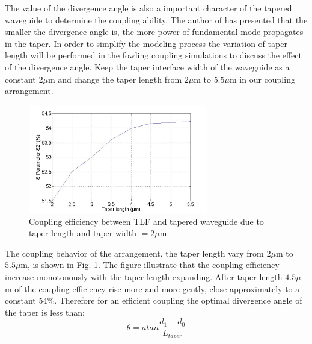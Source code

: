 The value of the divergence angle is also a important character of the tapered waveguide to determine the coupling ability. The author of \cite{study_linear_tapered_waveguides} has presented that the smaller the divergence angle is, the more power of fundamental mode propagates in the taper. In order to simplify the modeling process the variation of taper length will be performed in the fowling coupling simulations to discuss the effect of the divergence angle.
Keep the taper interface width of the waveguide as a constant $2\mu$m and change the taper length from $2\mu$m to $5.5\mu$m in our coupling arrangement.  

\begin{figure}[!ht]
\centering
\includegraphics[width=0.7\textwidth]{bilder/tapered_waveguide_dxx}
\caption{Coupling efficiency between TLF and tapered waveguide due to taper length and taper width $= 2\mu$m}
\label{fig:tapered_waveguide_dxx}
\end{figure}
The coupling behavior of the arrangement, the taper length vary from $2\mu$m to $5.5\mu$m, is shown in Fig. \ref{fig:tapered_waveguide_dxx}.  The figure illustrate that the coupling efficiency increase monotonously with the taper length expanding. After taper length $4.5\mu$m of the coupling efficiency rise more and more gently, close approximately to a constant $54\%$. 
Therefore for an efficient coupling the optimal divergence angle of the taper is less than:
\begin{equation}
\theta=atan\frac{d_{1}-d_{0}}{L_{taper}}
\label{eq:divergence_angle}
\end{equation}
